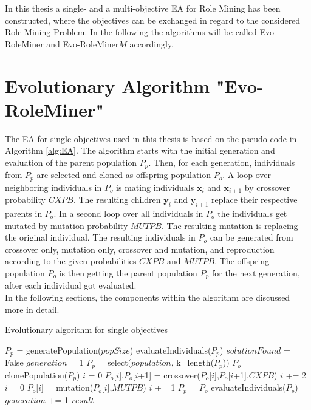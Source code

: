 In this thesis a single- and a multi-objective EA for Role Mining has been constructed, where the objectives can be exchanged in regard to the considered Role Mining Problem. In the following the algorithms will be called Evo-RoleMiner and Evo-RoleMiner$M$ accordingly. 

    \section{Evolutionary Algorithm "Evo-RoleMiner"}
    The EA for single objectives used in this thesis is based on the pseudo-code in Algorithm \ref{alg:EA}. The algorithm starts with the initial generation and evaluation of the parent population $P_p$. Then, for each generation, individuals from $P_p$ are selected and cloned as offspring population $P_o$. A loop over neighboring individuals in $P_o$ is mating individuals $\mathbf{x}_i$ and $\mathbf{x}_{i+1}$ by crossover probability $CXPB$. The resulting children $\mathbf{y}_i$ and $\mathbf{y}_{i+1}$ replace their respective parents in $P_o$. In a second loop over all individuals in $P_o$ the individuals get mutated by mutation probability $MUTPB$. The resulting mutation is replacing the original individual. The resulting individuals in $P_o$ can be generated from crossover only, mutation only, crossover and mutation, and reproduction according to the given probabilities $CXPB$ and $MUTPB$. The offspring population $P_o$ is then getting the parent population $P_p$ for the next generation, after each individual got evaluated.\\
    In the following sections, the components within the algorithm are discussed more in detail.
    
    \begin{algorithm}
        \caption{Evolutionary algorithm for single objectives}
        \label{alg:EA}
        \begin{algorithmic}[1]
                \State $P_p$ = generatePopulation($popSize$)
                \State evaluateIndividuals($P_p$)
                \State $solutionFound$ = False
                \State $generation$ = 1
                    \State $P_p$ = select($population$, k=length($P_p$))
                    \State $P_o$ = clonePopulation($P_p$)
                    \State $i$ = 0
                        \State $P_o$[$i$],$P_o$[$i$+1] = crossover($P_o$[$i$],$P_o$[$i$+1],$CXPB$)
                        \State $i$ += 2
                    \EndWhile
                    \State $i$ = 0
                        \State $P_o$[$i$] = mutation($P_o$[$i$],$MUTPB$)
                        \State $i$ += 1
                    \EndWhile
                    \State $P_p$ = $P_o$
                    \State evaluateIndividuals($P_p$)
                    \State $generation$ += 1
                \EndWhile
                \State \Return $result$
            \EndProcedure
        \end{algorithmic}
    \end{algorithm}

